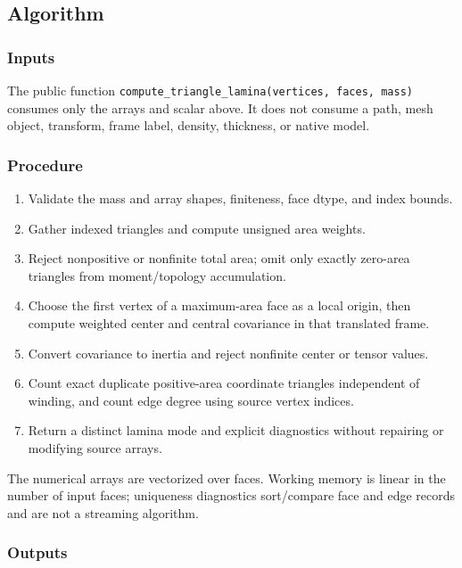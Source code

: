 \documentclass[
  american,
]{article}
\providecommand{\tightlist}{%
  \setlength{\itemsep}{0pt}\setlength{\parskip}{0pt}}
\begin{document}
\subsection{Algorithm}\label{algorithm-1}

\subsubsection{Inputs}\label{inputs-1}

The public function
\texttt{compute\_triangle\_lamina(vertices,\ faces,\ mass)} consumes
only the arrays and scalar above. It does not consume a path, mesh
object, transform, frame label, density, thickness, or native model.

\subsubsection{Procedure}\label{procedure-1}

\begin{enumerate}
\def\labelenumi{\arabic{enumi}.}
\tightlist
\item
  Validate the mass and array shapes, finiteness, face dtype, and index
  bounds.
\item
  Gather indexed triangles and compute unsigned area weights.
\item
  Reject nonpositive or nonfinite total area; omit only exactly
  zero-area triangles from moment/topology accumulation.
\item
  Choose the first vertex of a maximum-area face as a local origin, then
  compute weighted center and central covariance in that translated
  frame.
\item
  Convert covariance to inertia and reject nonfinite center or tensor
  values.
\item
  Count exact duplicate positive-area coordinate triangles independent
  of winding, and count edge degree using source vertex indices.
\item
  Return a distinct lamina mode and explicit diagnostics without
  repairing or modifying source arrays.
\end{enumerate}

The numerical arrays are vectorized over faces. Working memory is linear
in the number of input faces; uniqueness diagnostics sort/compare face
and edge records and are not a streaming algorithm.

\subsubsection{Outputs}\label{outputs-1}
\end{document}
